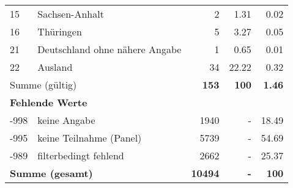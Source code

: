 \begin{longtable}{lXrrr}
     15 &
     \multicolumn{1}{X}{ Sachsen-Anhalt   } &


       \num{2} &
       \num[round-mode=places,round-precision=2]{1,31} &
         \num[round-mode=places,round-precision=2]{0,02} \\

     16 &
     \multicolumn{1}{X}{ Thüringen   } &


       \num{5} &
       \num[round-mode=places,round-precision=2]{3,27} &
         \num[round-mode=places,round-precision=2]{0,05} \\

     21 &
     \multicolumn{1}{X}{ Deutschland ohne nähere Angabe   } &


       \num{1} &
       \num[round-mode=places,round-precision=2]{0,65} &
         \num[round-mode=places,round-precision=2]{0,01} \\

     22 &
     \multicolumn{1}{X}{ Ausland   } &


       \num{34} &
       \num[round-mode=places,round-precision=2]{22,22} &
         \num[round-mode=places,round-precision=2]{0,32} \\
     \midrule
     \multicolumn{2}{l}{Summe (gültig)} &
       \textbf{\num{153}} &
     \textbf{100} &
       \textbf{\num[round-mode=places,round-precision=2]{1,46}} \\
     \multicolumn{5}{l}{\textbf{Fehlende Werte}}\\
       -998 &
       keine Angabe &
         \num{1940} &
        - &
         \num[round-mode=places,round-precision=2]{18,49} \\
       -995 &
       keine Teilnahme (Panel) &
         \num{5739} &
        - &
         \num[round-mode=places,round-precision=2]{54,69} \\
       -989 &
       filterbedingt fehlend &
         \num{2662} &
        - &
         \num[round-mode=places,round-precision=2]{25,37} \\
     \midrule
     \multicolumn{2}{l}{\textbf{Summe (gesamt)}} &
          \textbf{\num{10494}} &
        \textbf{-} &
        \textbf{100} \\
     \bottomrule
     \end{longtable}
     
